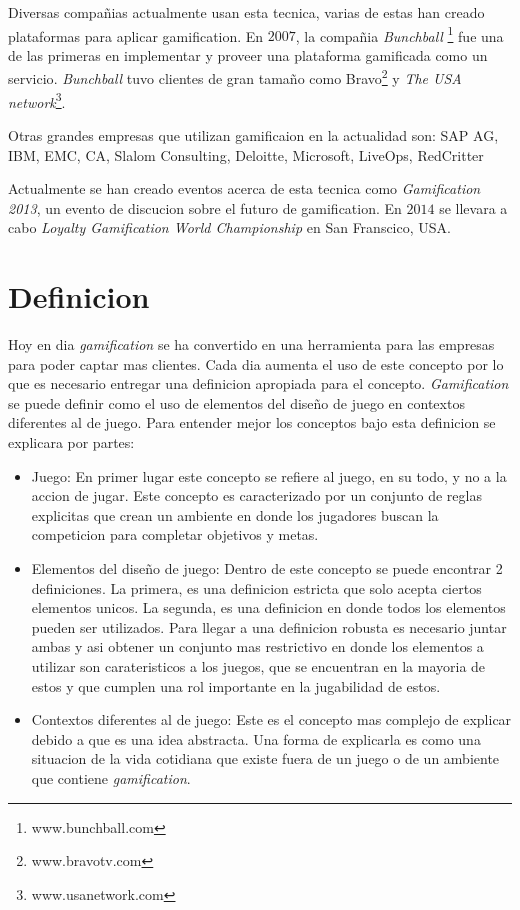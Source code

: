 

Diversas compañias actualmente usan esta tecnica, varias de estas han creado plataformas para aplicar gamification.
En $2007$, la compañia \emph{Bunchball} \footnote{www.bunchball.com} fue una de las primeras en implementar y proveer
una plataforma gamificada como un servicio\cite{Gam:Bunchball:1}. \emph{Bunchball} tuvo clientes de gran tamaño como
Bravo\footnote{www.bravotv.com} y \emph{The USA network}\footnote{www.usanetwork.com}\cite{Gam:Bunchball:2}.

Otras grandes empresas que utilizan gamificaion en la actualidad son: SAP AG, IBM, EMC, CA, Slalom Consulting,
 Deloitte, Microsoft, LiveOps, RedCritter\cite{Gam:Companies:1}  

Actualmente se han creado eventos acerca de esta tecnica como \emph{Gamification 2013}, un evento de discucion sobre
el futuro de gamification\cite{Gam:Events:1}. En $2014$ se llevara a cabo \emph{Loyalty Gamification World Championship} en San Franscico, USA.\cite{Gam:Events:2}

\section{Definicion}

Hoy en dia \emph{gamification} se ha convertido en una herramienta para las empresas 
para poder captar mas clientes. Cada dia aumenta el uso de este concepto por lo que es
necesario entregar una definicion apropiada para el concepto.  \emph{Gamification} se puede definir
como el uso de elementos del diseño de juego en contextos diferentes al de juego. Para entender mejor 
los conceptos bajo esta definicion se explicara por partes:

\begin{itemize}

\item Juego: En primer lugar este concepto se refiere al juego, en su todo, y no a la accion de jugar.
Este concepto es caracterizado por un conjunto de reglas explicitas que crean un ambiente  
en donde los jugadores buscan la competicion para completar objetivos y metas.

\item Elementos del diseño de juego: Dentro de este concepto se puede encontrar 2 definiciones.
La primera, es una definicion estricta que solo acepta ciertos elementos unicos. La segunda, 
es una definicion en donde todos los elementos pueden ser utilizados. Para llegar a una 
definicion robusta es necesario juntar ambas y asi obtener un conjunto mas restrictivo en donde 
los elementos a utilizar son carateristicos a los juegos, que se encuentran en la mayoria de estos y 
que cumplen una rol importante en la jugabilidad de estos.

\item Contextos diferentes al de juego: Este es el concepto mas complejo de explicar debido a que es una idea  
abstracta. Una forma de explicarla es como una situacion de la vida cotidiana que existe fuera 
de un juego o de un ambiente que contiene \emph{gamification}.

\end{itemize}


